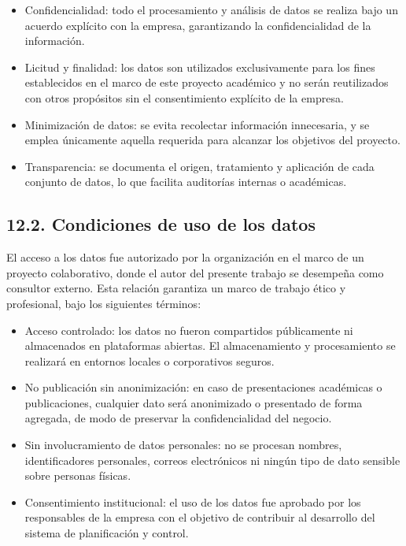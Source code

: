 \documentclass[
11pt, %
]{charter}
\begin{document}
\begin{itemize}
  \item Confidencialidad: todo el procesamiento y análisis de datos se realiza bajo un acuerdo explícito con la empresa, garantizando la confidencialidad de la información.
  \item Licitud y finalidad: los datos son utilizados exclusivamente para los fines establecidos en el marco de este proyecto académico y no serán reutilizados con otros propósitos sin el consentimiento explícito de la empresa.
  \item Minimización de datos: se evita recolectar información innecesaria, y se emplea únicamente aquella requerida para alcanzar los objetivos del proyecto.
  \item Transparencia: se documenta el origen, tratamiento y aplicación de cada conjunto de datos, lo que facilita auditorías internas o académicas.
\end{itemize}

\subsection*{12.2. Condiciones de uso de los datos}

El acceso a los datos fue autorizado por la organización en el marco de un proyecto colaborativo, donde el autor del presente trabajo se desempeña como consultor externo. Esta relación garantiza un marco de trabajo ético y profesional, bajo los siguientes términos:

\begin{itemize}
  \item Acceso controlado: los datos no fueron compartidos públicamente ni almacenados en plataformas abiertas. El almacenamiento y procesamiento se realizará en entornos locales o corporativos seguros.
  \item No publicación sin anonimización: en caso de presentaciones académicas o publicaciones, cualquier dato será anonimizado o presentado de forma agregada, de modo de preservar la confidencialidad del negocio.
  \item Sin involucramiento de datos personales: no se procesan nombres, identificadores personales, correos electrónicos ni ningún tipo de dato sensible sobre personas físicas.
  \item Consentimiento institucional: el uso de los datos fue aprobado por los responsables de la empresa con el objetivo de contribuir al desarrollo del sistema de planificación y control.
\end{itemize}
\end{document}
